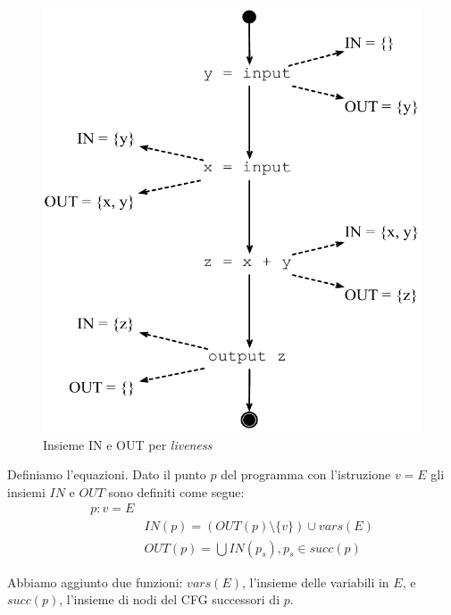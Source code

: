 \begin{figure}[H]
  \centering
  \includegraphics[scale=0.4]{res/image/in_out}
  \caption{Insieme IN e OUT per \textit{liveness}}
  \label{img:in_out}
\end{figure}

Definiamo l'equazioni. Dato il punto $p$ del programma con l'istruzione $v=E$
gli insiemi $IN$ e $OUT$ sono definiti come segue:
\begin{align*}
p : v = E &                                             \\
          & IN(p) = (OUT(p)\setminus\{v\}) \cup vars(E) \\
          & OUT(p) = \bigcup IN(p_s), p_s \in succ(p)
\end{align*}

Abbiamo aggiunto due funzioni: $vars(E)$, l'insieme delle variabili in $E$, e
$succ(p)$, l'insieme di nodi del CFG successori di $p$.


